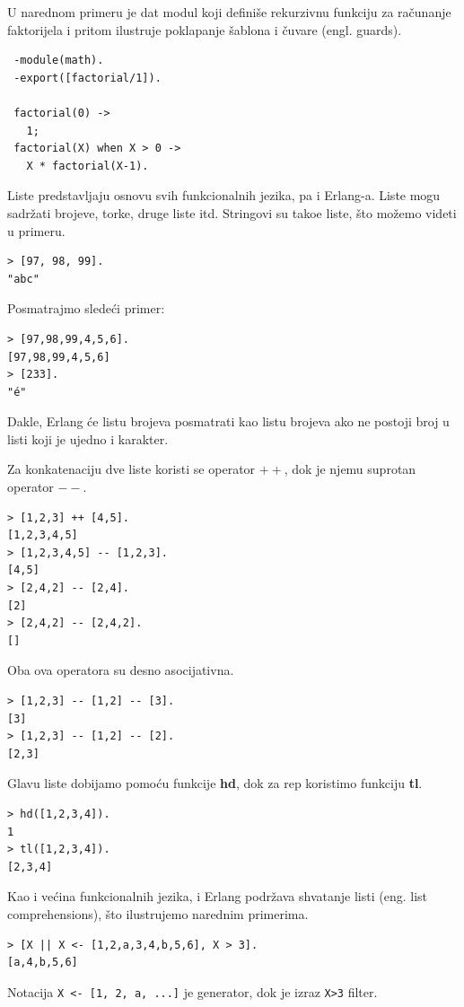 \documentclass[a4paper]{article}
\begin{document}
{U narednom primeru je dat modul koji defini\v se rekurzivnu funkciju za ra\v cunanje faktorijela i pritom ilustruje poklapanje \v sablona i \v cuvare (engl. guards).

\begin{verbatim}
 -module(math).
 -export([factorial/1]).

 factorial(0) ->
   1;
 factorial(X) when X > 0 ->
   X * factorial(X-1).
\end{verbatim}

Liste predstavljaju osnovu svih funkcionalnih jezika, pa i Erlang-a. Liste mogu sadr\v zati brojeve, torke, druge liste itd. Stringovi su tako\dj e liste, \v sto mo\v zemo videti u primeru.

\begin{verbatim}
> [97, 98, 99].
"abc"
\end{verbatim}

Posmatrajmo slede\' ci primer:
\begin{verbatim}
> [97,98,99,4,5,6].
[97,98,99,4,5,6]
> [233].
"é"
\end{verbatim}

Dakle, Erlang \' ce listu brojeva posmatrati kao listu brojeva ako ne postoji broj u listi koji je ujedno i karakter.

Za konkatenaciju dve liste koristi se operator $++$, dok je njemu suprotan operator $--$.
\begin{verbatim}
> [1,2,3] ++ [4,5].
[1,2,3,4,5]
> [1,2,3,4,5] -- [1,2,3].
[4,5]
> [2,4,2] -- [2,4].
[2]
> [2,4,2] -- [2,4,2].
[]
\end{verbatim}

Oba ova operatora su desno asocijativna.
\begin{verbatim}
> [1,2,3] -- [1,2] -- [3].
[3]
> [1,2,3] -- [1,2] -- [2].
[2,3]
\end{verbatim}

Glavu liste dobijamo pomoću funkcije \textbf{hd}, dok za rep koristimo funkciju \textbf{tl}.
\begin{verbatim}
> hd([1,2,3,4]).
1
> tl([1,2,3,4]).
[2,3,4]
\end{verbatim}

Kao i većina funkcionalnih jezika, i Erlang podržava shvatanje listi (eng. list comprehensions), što ilustrujemo narednim primerima.
\begin{verbatim}
> [X || X <- [1,2,a,3,4,b,5,6], X > 3].
[a,4,b,5,6]
\end{verbatim}
Notacija {\texttt{X <- [1, 2, a, ...]}} je generator, dok je izraz {\texttt{X>3}} filter.\\

}
\end{document}
